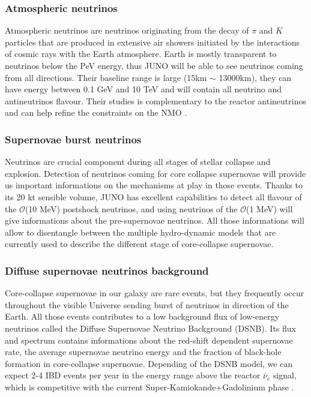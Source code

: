 \subsubsection{Atmospheric neutrinos}

Atmospheric neutrinos are neutrinos originating from the decay of $\pi$ and $K$ particles that are produced in extensive air showers initiated by the interactions of cosmic rays with the Earth atmosphere. Earth is mostly transparent to neutrinos below the PeV energy, thus JUNO will be able to see neutrinos coming from all directions. Their baseline range is large (15km $\sim$ 13000km), they can have energy between 0.1 GeV and 10 TeV and will contain all neutrino and antineutrinos flavour. Their studies is complementary to the reactor antineutrinos and can help refine the constraints on the NMO \cite{an_neutrino_2016}.

\subsubsection{Supernovae burst neutrinos}

Neutrinos are crucial component during all stages of stellar collapse and explosion. Detection of neutrinos coming for core collapse supernovae will provide us important informations on the mechanisms at play in those events.
Thanks to its 20 kt sensible volume, JUNO has excellent capabilities to detect all flavour of the $\mathcal{O}$(10 MeV) postshock neutrinos, and using neutrinos of the $\mathcal{O}$(1 MeV) will give informations about the pre-supernovae neutrinos. All those informations will allow to disentangle between the multiple hydro-dynamic models that are currently used to describe the different stage of core-collapse supernovae.

\subsubsection{Diffuse supernovae neutrinos background}

Core-collapse supernovae in our galaxy are rare events, but they frequently occur throughout the visible Universe sending burst of neutrinos in direction of the Earth. All those events contributes to a low background flux of low-energy neutrinos called the Diffuse Supernovae Neutrino Background (DSNB). Its flux and spectrum contains informations about the red-shift dependent supernovae rate, the average supernovae neutrino energy and the fraction of black-hole formation in core-collapse supernovae. Depending of the DSNB model, we can expect 2-4 IBD events per year in the energy range above the reactor $\bar{\nu}_e$ signal, which is competitive with the current Super-Kamiokande+Gadolinium phase \cite{collaboration_diffuse_2021}.

